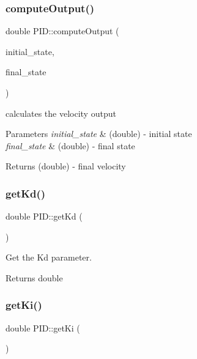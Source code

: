 \subsubsection{\texorpdfstring{compute\+Output()}{computeOutput()}}
{\footnotesize\ttfamily double P\+I\+D\+::compute\+Output (\begin{DoxyParamCaption}\item[{double}]{initial\+\_\+state,  }\item[{double}]{final\+\_\+state }\end{DoxyParamCaption})}



calculates the velocity output 


\begin{DoxyParams}{Parameters}
{\em initial\+\_\+state} & (double) -\/ initial state \\
\hline
{\em final\+\_\+state} & (double) -\/ final state \\
\hline
\end{DoxyParams}
\begin{DoxyReturn}{Returns}
(double) -\/ final velocity 
\end{DoxyReturn}
\mbox{\label{classPID_a39997546e8d1025c6c867e31e8b8e916}} 
\subsubsection{\texorpdfstring{get\+Kd()}{getKd()}}
{\footnotesize\ttfamily double P\+I\+D\+::get\+Kd (\begin{DoxyParamCaption}{ }\end{DoxyParamCaption})}



Get the Kd parameter. 

\begin{DoxyReturn}{Returns}
double 
\end{DoxyReturn}
\mbox{\label{classPID_a89dedae29ef5a1359fd438824523bfc5}} 
\subsubsection{\texorpdfstring{get\+Ki()}{getKi()}}
{\footnotesize\ttfamily double P\+I\+D\+::get\+Ki (\begin{DoxyParamCaption}{ }\end{DoxyParamCaption})}



